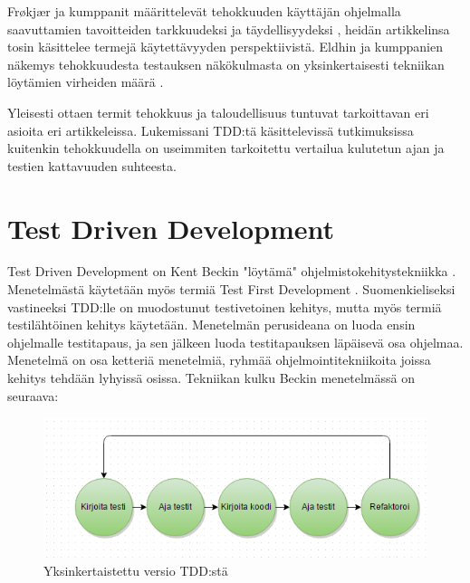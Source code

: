 \documentclass[finnish]{tktltiki2}
\theoremstyle{definition}
\theoremstyle{remark}
\begin{document}
Frøkjær ja kumppanit määrittelevät tehokkuuden käyttäjän ohjelmalla saavuttamien tavoitteiden tarkkuudeksi ja täydellisyydeksi \cite{Frokjaer00}, heidän artikkelinsa tosin käsittelee termejä käytettävyyden perspektiivistä. Eldhin ja kumppanien näkemys tehokkuudesta testauksen näkökulmasta on yksinkertaisesti tekniikan löytämien virheiden määrä \cite{Eldh06}.



Yleisesti ottaen termit tehokkuus ja taloudellisuus tuntuvat tarkoittavan eri asioita eri artikkeleissa. Lukemissani TDD:tä käsittelevissä tutkimuksissa kuitenkin tehokkuudella on useimmiten tarkoitettu vertailua kulutetun ajan ja testien kattavuuden suhteesta. 





\section{Test Driven Development}


Test Driven Development on Kent Beckin "löytämä" ohjelmistokehitystekniikka \cite{Beck03}. Menetelmästä käytetään myös termiä Test First Development \cite{Crispin06}. Suomenkieliseksi vastineeksi TDD:lle on muodostunut testivetoinen kehitys, mutta myös termiä testilähtöinen kehitys käytetään. Menetelmän perusideana on luoda ensin ohjelmalle testitapaus, ja sen jälkeen luoda testitapauksen läpäisevä osa ohjelmaa. Menetelmä on osa ketteriä menetelmiä, ryhmää ohjelmointitekniikoita joissa kehitys tehdään lyhyissä osissa. Tekniikan kulku Beckin menetelmässä on seuraava:

\begin{figure}[ht]
\includegraphics{tdd}
\caption{Yksinkertaistettu versio TDD:stä}
\end{figure}
\end{document}
